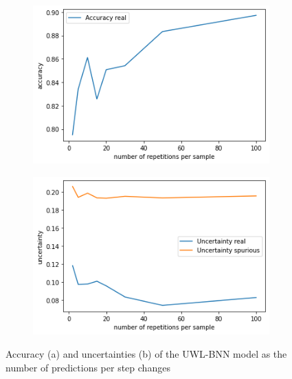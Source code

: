 \documentclass[11pt,twoside,a4paper]{article}
\begin{document}
\begin{figure}[!t]
    \centering
    \begin{subfigure}{0.49\textwidth}
	\includegraphics[width=\linewidth]{images/accuracy_preds.png}
        \caption{}
    \end{subfigure}
    \begin{subfigure}{0.49\textwidth}
	\includegraphics[width=\linewidth]{images/uc_preds.png}
        \caption{}
    \end{subfigure}
    \caption{Accuracy (a) and uncertainties (b) of the UWL-BNN model as the number of predictions per step changes}
    \label{fig:n_predictions}
\end{figure}
\end{document}
